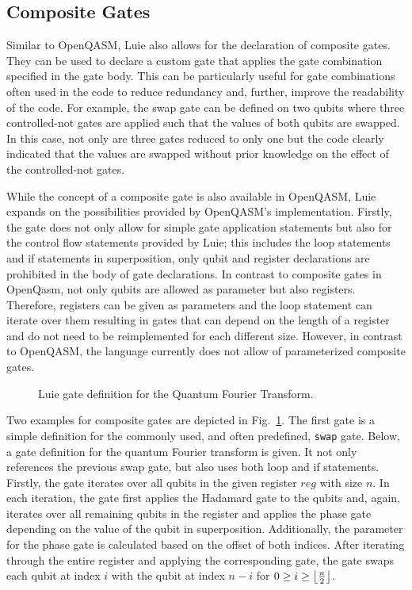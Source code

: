 \subsection{Composite Gates}
\label{sec:concept_compositeGates}
Similar to OpenQASM, Luie also allows for the declaration of composite gates. They can be used to declare a custom gate that applies the gate combination specified in the gate body. This can be particularly useful for gate combinations often used in the code to reduce redundancy and, further, improve the readability of the code. For example, the swap gate can be defined on two qubits where three controlled-not gates are applied such that the values of both qubits are swapped. In this case, not only are three gates reduced to only one but the code clearly indicated that the values are swapped without prior knowledge on the effect of the controlled-not gates.

While the concept of a composite gate is also available in OpenQASM, Luie expands on the possibilities provided by OpenQASM's implementation. Firstly, the gate does not only allow for simple gate application statements but also for the control flow statements provided by Luie; this includes the loop statements and if statements in superposition, only qubit and register declarations are prohibited in the body of gate declarations. In contrast to composite gates in OpenQasm, not only qubits are allowed as parameter but also registers. Therefore, registers can be given as parameters and the loop statement can iterate over them resulting in gates that can depend on the length of a register and do not need to be reimplemented for each different size. However, in contrast to OpenQASM, the language currently does not allow of parameterized composite gates.   

\begin{figure}[htp]
    \centering     
    
    \caption{Luie gate definition for the Quantum Fourier Transform.}
    \label{fig:qft_example}
\end{figure}

Two examples for composite gates are depicted in Fig.~\ref{fig:qft_example}. The first gate is a simple definition for the commonly used, and often predefined, \texttt{swap} gate. Below, a gate definition for the quantum Fourier transform is given. It not only references the previous swap gate, but also uses both loop and if statements. Firstly, the gate iterates over all qubits in the given register $reg$ with size $n$. In each iteration, the gate first applies the Hadamard gate to the qubits and, again, iterates over all remaining qubits in the register and applies the phase gate depending on the value of the qubit in superposition. Additionally, the parameter for the phase gate is calculated based on the offset of both indices. After iterating through the entire register and applying the corresponding gate, the gate swaps each qubit at index $i$ with the qubit at index $n - i$ for $0 \geq i \geq \floor*{\frac{n}{2}}$.